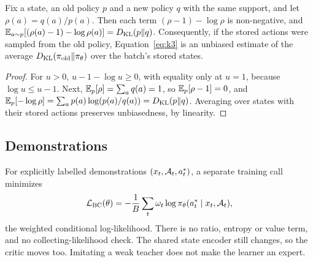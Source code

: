 \begin{proposition}
\label{prop:k3}
Fix a state, an old policy $p$ and a new policy $q$ with the same support, and
let $\rho(a)=q(a)/p(a)$. Then each term $(\rho-1)-\log\rho$ is non-negative,
and $\mathbb{E}_{a\sim p}[(\rho(a)-1)-\log\rho(a)]=D_{\mathrm{KL}}(p\Vert q)$. Consequently, if
the stored actions were sampled from the old policy, Equation~\eqref{eq:k3} is
an unbiased estimate of the average $D_{\mathrm{KL}}(\pi_{\mathrm{old}}\Vert\pi_\theta)$
over the batch's stored states.
\end{proposition}
\begin{proof}
For $u>0$, $u-1-\log u\ge0$, with equality only at $u=1$, because $\log u\le
u-1$. Next, $\mathbb{E}_p[\rho]=\sum_aq(a)=1$, so $\mathbb{E}_p[\rho-1]=0$, and
$\mathbb{E}_p[-\log\rho]=\sum_ap(a)\log(p(a)/q(a))=D_{\mathrm{KL}}(p\Vert q)$. Averaging over
states with their stored actions preserves unbiasedness, by linearity.
\end{proof}


\subsection{Demonstrations}
For explicitly labelled demonstrations $(x_t,\mathcal{A}_t,a_t^*)$, a separate training
call minimizes
\begin{equation}
  \mathcal L_{\mathrm{BC}}(\theta)=-\frac1B\sum_t\omega_t\log\pi_\theta(a_t^*\mid x_t,\mathcal{A}_t),
\end{equation}
the weighted conditional log-likelihood. There is no ratio, entropy or value
term, and no collecting-likelihood check. The shared state encoder still
changes, so the critic moves too. Imitating a weak teacher does not make the
learner an expert.


